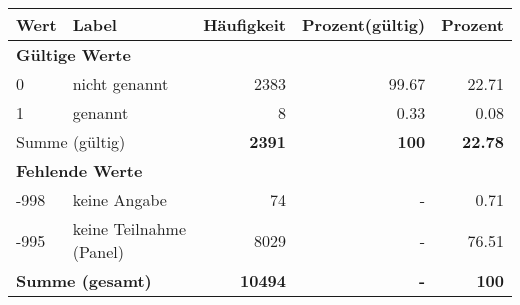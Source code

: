      \begin{longtable}{lXrrr}
     \toprule
     \textbf{Wert} & \textbf{Label} & \textbf{Häufigkeit} & \textbf{Prozent(gültig)} & \textbf{Prozent} \\
     \endhead
     \midrule
     \multicolumn{5}{l}{\textbf{Gültige Werte}}\\

     0 &
     \multicolumn{1}{X}{ nicht genannt   } &


       \num{2383} &
       \num[round-mode=places,round-precision=2]{99.67} &
         \num[round-mode=places,round-precision=2]{22.71} \\

     1 &
     \multicolumn{1}{X}{ genannt   } &


       \num{8} &
       \num[round-mode=places,round-precision=2]{0.33} &
         \num[round-mode=places,round-precision=2]{0.08} \\
     \midrule
     \multicolumn{2}{l}{Summe (gültig)} &
       \textbf{\num{2391}} &
     \textbf{\num{100}} &
       \textbf{\num[round-mode=places,round-precision=2]{22.78}} \\
     \multicolumn{5}{l}{\textbf{Fehlende Werte}}\\
       -998 &
       keine Angabe &
         \num{74} &
        - &
         \num[round-mode=places,round-precision=2]{0.71} \\
       -995 &
       keine Teilnahme (Panel) &
         \num{8029} &
        - &
         \num[round-mode=places,round-precision=2]{76.51} \\
     \midrule
     \multicolumn{2}{l}{\textbf{Summe (gesamt)}} &
          \textbf{\num{10494}} &
        \textbf{-} &
        \textbf{\num{100}} \\
     \bottomrule
     \end{longtable}
     
